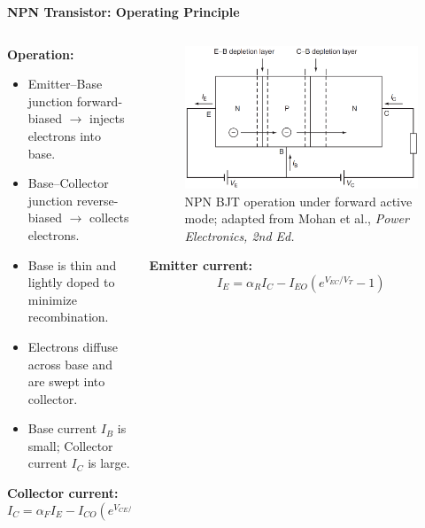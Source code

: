 \begin{frame}{\textbf{NPN Transistor: Operating Principle}}
    \begin{columns}
    \begin{column}{0.5\textwidth}
        \textbf{Operation:}
        \begin{itemize}
            \item Emitter–Base junction forward-biased $\rightarrow$ injects electrons into base.
            \item Base–Collector junction reverse-biased $\rightarrow$ collects electrons.
            \item Base is thin and lightly doped to minimize recombination.
            \item Electrons diffuse across base and are swept into collector.
            \item Base current $I_B$ is small; Collector current $I_C$ is large.
        \end{itemize}
        \textbf{Collector current:}
        \begin{equation}
            I_C = \alpha_F I_E - I_{CO}(e^{V_{CE}/V_T} - 1)
        \end{equation}
    \end{column}
    \begin{column}{0.5\textwidth}
        \begin{figure}
            \centering
            \includegraphics[width=0.8\linewidth]{fig/lec04/npn_bjt_operation.png}
            \caption{NPN BJT operation under forward active mode; adapted from Mohan et al., \textit{Power Electronics, 2nd Ed.}}
            \label{fig:npn_bjt_operation}
        \end{figure}
        \textbf{Emitter current:}
        \begin{equation}
        I_E = \alpha_R I_C - I_{EO}(e^{V_{EC}/V_T} - 1)
        \end{equation}
    \end{column}
  \end{columns}
\end{frame}

